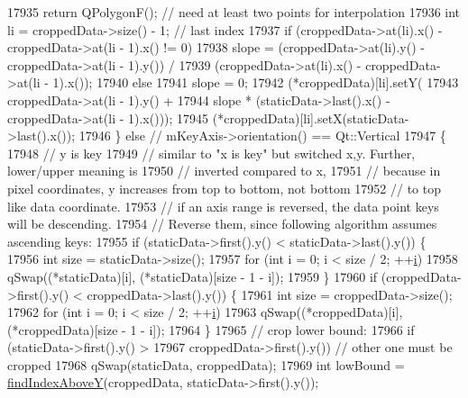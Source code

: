 \begin{DoxyCode}
17935       \textcolor{keywordflow}{return} QPolygonF(); \textcolor{comment}{// need at least two points for interpolation}
17936     \textcolor{keywordtype}{int} li = croppedData->size() - 1; \textcolor{comment}{// last index}
17937     \textcolor{keywordflow}{if} (croppedData->at(li).x() - croppedData->at(li - 1).x() != 0)
17938       slope = (croppedData->at(li).y() - croppedData->at(li - 1).y()) /
17939               (croppedData->at(li).x() - croppedData->at(li - 1).x());
17940     \textcolor{keywordflow}{else}
17941       slope = 0;
17942     (*croppedData)[li].setY(
17943         croppedData->at(li - 1).y() +
17944         slope * (staticData->last().x() - croppedData->at(li - 1).x()));
17945     (*croppedData)[li].setX(staticData->last().x());
17946   \} \textcolor{keywordflow}{else} \textcolor{comment}{// mKeyAxis->orientation() == Qt::Vertical}
17947   \{
17948     \textcolor{comment}{// y is key}
17949     \textcolor{comment}{// similar to "x is key" but switched x,y. Further, lower/upper meaning is}
17950     \textcolor{comment}{// inverted compared to x,}
17951     \textcolor{comment}{// because in pixel coordinates, y increases from top to bottom, not bottom}
17952     \textcolor{comment}{// to top like data coordinate.}
17953     \textcolor{comment}{// if an axis range is reversed, the data point keys will be descending.}
17954     \textcolor{comment}{// Reverse them, since following algorithm assumes ascending keys:}
17955     \textcolor{keywordflow}{if} (staticData->first().y() < staticData->last().y()) \{
17956       \textcolor{keywordtype}{int} size = staticData->size();
17957       \textcolor{keywordflow}{for} (\textcolor{keywordtype}{int} i = 0; i < size / 2; ++\hyperlink{_comparision_pictures_2_createtest_image_8m_a6f6ccfcf58b31cb6412107d9d5281426}{i})
17958         qSwap((*staticData)[i], (*staticData)[size - 1 - i]);
17959     \}
17960     \textcolor{keywordflow}{if} (croppedData->first().y() < croppedData->last().y()) \{
17961       \textcolor{keywordtype}{int} size = croppedData->size();
17962       \textcolor{keywordflow}{for} (\textcolor{keywordtype}{int} i = 0; i < size / 2; ++\hyperlink{_comparision_pictures_2_createtest_image_8m_a6f6ccfcf58b31cb6412107d9d5281426}{i})
17963         qSwap((*croppedData)[i], (*croppedData)[size - 1 - i]);
17964     \}
17965     \textcolor{comment}{// crop lower bound:}
17966     \textcolor{keywordflow}{if} (staticData->first().y() >
17967         croppedData->first().y()) \textcolor{comment}{// other one must be cropped}
17968       qSwap(staticData, croppedData);
17969     \textcolor{keywordtype}{int} lowBound = \hyperlink{class_q_c_p_graph_adf50243f1df203883a2187089734bfcb}{findIndexAboveY}(croppedData, staticData->first().y());

\end{DoxyCode}
